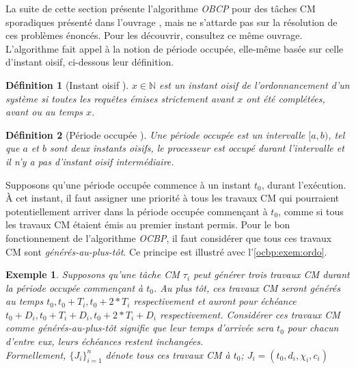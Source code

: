 \documentclass[12pt,a4paper,oneside]{book}
\theoremstyle{break}
\newtheorem{defin}{Définition}[chapter]
\newtheorem{exem}{Exemple}[chapter]
\theoremstyle{breakplain}
\begin{document}
La suite de cette section présente l'algorithme \textit{OBCP} pour des tâches CM sporadiques présenté dans l'ouvrage \cite{li2010algorithm}, mais ne s'attarde pas sur la résolution de ces problèmes énoncés. Pour les découvrir, consultez ce même ouvrage.\\

L'algorithme fait appel à la notion de période occupée, elle-même basée sur celle d'instant oisif, ci-dessous leur définition.\\

\begin{defin}[Instant oisif \cite{goossens1999scheduling}]
$x \in \mathbb{N}$ est un instant oisif de l'ordonnancement d'un système si toutes les requêtes émises strictement avant $x$ ont été complétées, avant ou au temps $x$.\\
\end{defin}

\begin{defin}[Période occupée \cite{goossens1999scheduling}]
Une période occupée est un intervalle $[a, b)$, tel que $a$ et $b$ sont deux instants oisifs, le processeur est occupé durant l'intervalle et il n'y a pas d'instant oisif intermédiaire. 
\end{defin}

Supposons qu'une période occupée commence à un instant $t_0$, durant l'exécution. À cet instant, il faut assigner une priorité à tous les travaux CM qui pourraient potentiellement arriver dans la période occupée commençant à $t_0$, comme si tous les travaux CM étaient émis au premier instant permis. Pour le bon fonctionnement de l'algorithme \textit{OCBP}, il faut considérer que tous ces travaux CM sont \textit{générés-au-plus-tôt}. Ce principe est illustré avec l'\autoref{ocbp:exem:ordo}.\\

\begin{exem}
\label{ocbp:exem:ordo}
Supposons qu'une tâche CM $\tau_i$ peut générer trois travaux CM durant la période occupée commençant à $t_0$. Au plus tôt, ces travaux CM seront générés au temps $t_0, t_0+T_i, t_0+2*T_i$ respectivement et auront pour échéance $t_0+D_i, t_0+T_i+D_i, t_0+2*T_i+D_i$ respectivement. Considérer ces travaux CM comme \textit{générés-au-plus-tôt} signifie que leur temps d'arrivée sera $t_0$ pour chacun d'entre eux, leurs échéances restent inchangées.\\

Formellement, $\{J_i\}^n_{i=1}$ dénote tous ces travaux CM à $t_0$; $J_i = (t_0, d_i, \chi_i, c_i)$
\end{exem}
\end{document}
